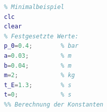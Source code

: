 

\label{subsec:minimalbeispiel}
\begin{lstlisting}[language=Matlab, caption={Ein bisschen Matlab Code}]
%% 
% Minimalbeispiel 
clc
clear
% Festgesetzte Werte:
p_0=0.4;        % bar
a=0.03;         % m
b=0.04;         % m
m=2;            % kg
t_E=1.3;        % s
t=0;            % s
%% Berechnung der Konstanten

\end{lstlisting}